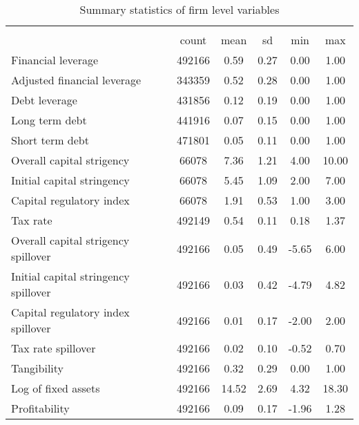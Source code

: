 \begin{table}[htbp]\centering
\def\sym#1{\ifmmode^{#1}\else\(^{#1}\)\fi}
\caption{Summary statistics of firm level variables}
\begin{tabular}{l*{1}{ccccc}}
\hline\hline
                    &\multicolumn{5}{c}{}                                            \\
                    &       count&        mean&          sd&         min&         max\\
\hline
Financial leverage  &      492166&        0.59&        0.27&        0.00&        1.00\\
Adjusted financial leverage&      343359&        0.52&        0.28&        0.00&        1.00\\
Debt leverage       &      431856&        0.12&        0.19&        0.00&        1.00\\
Long term debt      &      441916&        0.07&        0.15&        0.00&        1.00\\
Short term debt     &      471801&        0.05&        0.11&        0.00&        1.00\\
Overall capital strigency&       66078&        7.36&        1.21&        4.00&       10.00\\
Initial capital stringency&       66078&        5.45&        1.09&        2.00&        7.00\\
Capital regulatory index&       66078&        1.91&        0.53&        1.00&        3.00\\
Tax rate            &      492149&        0.54&        0.11&        0.18&        1.37\\
Overall capital strigency spillover&      492166&        0.05&        0.49&       -5.65&        6.00\\
Initial capital stringency spillover&      492166&        0.03&        0.42&       -4.79&        4.82\\
Capital regulatory index spillover&      492166&        0.01&        0.17&       -2.00&        2.00\\
Tax rate spillover  &      492166&        0.02&        0.10&       -0.52&        0.70\\
Tangibility         &      492166&        0.32&        0.29&        0.00&        1.00\\
Log of fixed assets &      492166&       14.52&        2.69&        4.32&       18.30\\
Profitability       &      492166&        0.09&        0.17&       -1.96&        1.28\\

\end{tabular}
\end{table}
